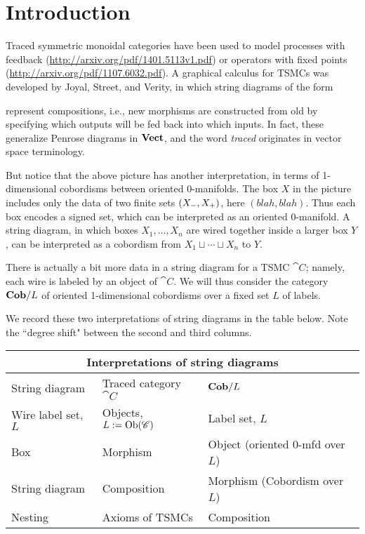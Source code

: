 \chapter{Introduction}

Traced symmetric monoidal categories have been used to model processes with feedback (\url{http://arxiv.org/pdf/1401.5113v1.pdf})  or operators with fixed points (\url{http://arxiv.org/pdf/1107.6032.pdf}). A graphical calculus for TSMCs was developed by Joyal, Street, and Verity, in which string diagrams of the form
\begin{center}\end{center}
represent compositions, i.e., new morphisms are constructed from old by specifying which outputs will be fed back into which inputs. In fact, these generalize Penrose diagrams in $\mathbf{Vect}$, and the word \emph{traced} originates in vector space terminology.  

But notice that the above picture has another interpretation, in terms of 1-dimensional cobordisms between oriented 0-manifolds. The box $X$ in the picture includes only the data of two finite sets $({X_-},{X_+})$, here $(blah,blah)$. Thus each box encodes a signed set, which can be interpreted as an oriented 0-manifold. A string diagram, in which boxes $X_1,\ldots,X_n$ are wired together inside a larger box $Y$, can be interpreted as a cobordism from $X_1\sqcup\cdots\sqcup X_n$ to $Y$. 

There is actually a bit more data in a string diagram for a TSMC $\cat{C}$; namely, each wire is labeled by an object of $\cat{C}$. We will thus consider the category $\mathbf{Cob}/L$ of oriented 1-dimensional cobordisms over a fixed set $L$ of labels. 

We record these two interpretations of string diagrams in the table below. Note the ``degree shift" between the second and third columns.
\begin{center}
\begin{tabular}{| l | l | l |}
\hline
\multicolumn{3}{|c|}{Interpretations of string diagrams}\\\hline
String diagram & Traced category $\cat{C}$ & $\mathbf{Cob}/L$\\\bhline
Wire label set, $L$&Objects, $L:=\operatorname{Ob}(\mathscr{C})$&Label set, $L$\\
Box & Morphism & Object (oriented 0-mfd over $L$)\\
String diagram & Composition & Morphism (Cobordism over $L$)\\
Nesting & Axioms of TSMCs & Composition\\\hline
\end{tabular}
\end{center}

